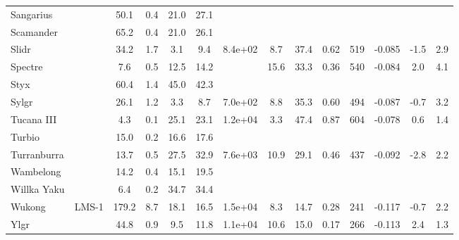 \begin{tabular}{llSSSSSSSSrSSS}
Sangarius &  & 50.1 & 0.4 & 21.0 & 27.1 &  &  &  &  &  &  &  &  \\
Scamander &  & 65.2 & 0.4 & 21.0 & 26.1 &  &  &  &  &  &  &  &  \\
Slidr &  & 34.2 & 1.7 & 3.1 & 9.4 & 8.4e+02 & 8.7 & 37.4 & 0.62 & 519 & -0.085 & -1.5 & 2.9 \\
Spectre &  & 7.6 & 0.5 & 12.5 & 14.2 &  & 15.6 & 33.3 & 0.36 & 540 & -0.084 & 2.0 & 4.1 \\
Styx &  & 60.4 & 1.4 & 45.0 & 42.3 &  &  &  &  &  &  &  &  \\
Sylgr &  & 26.1 & 1.2 & 3.3 & 8.7 & 7.0e+02 & 8.8 & 35.3 & 0.60 & 494 & -0.087 & -0.7 & 3.2 \\
Tucana III &  & 4.3 & 0.1 & 25.1 & 23.1 & 1.2e+04 & 3.3 & 47.4 & 0.87 & 604 & -0.078 & 0.6 & 1.4 \\
Turbio &  & 15.0 & 0.2 & 16.6 & 17.6 &  &  &  &  &  &  &  &  \\
Turranburra &  & 13.7 & 0.5 & 27.5 & 32.9 & 7.6e+03 & 10.9 & 29.1 & 0.46 & 437 & -0.092 & -2.8 & 2.2 \\
Wambelong &  & 14.2 & 0.4 & 15.1 & 19.5 &  &  &  &  &  &  &  &  \\
Willka Yaku &  & 6.4 & 0.2 & 34.7 & 34.4 &  &  &  &  &  &  &  &  \\
Wukong & LMS-1 & 179.2 & 8.7 & 18.1 & 16.5 & 1.5e+04 & 8.3 & 14.7 & 0.28 & 241 & -0.117 & -0.7 & 2.2 \\
Ylgr &  & 44.8 & 0.9 & 9.5 & 11.8 & 1.1e+04 & 10.6 & 15.0 & 0.17 & 266 & -0.113 & 2.4 & 1.3 \\
\hline
\end{tabular}